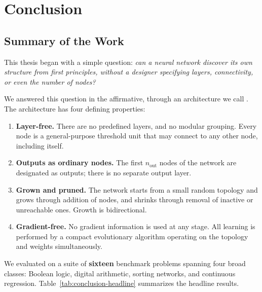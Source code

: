 
\chapter{Conclusion}
\label{ch:conclusion}

\section{Summary of the Work}

This thesis began with a simple question: \emph{can a neural network
discover its own structure from first principles, without a designer
specifying layers, connectivity, or even the number of nodes?}

We answered this question in the affirmative, through an architecture
we call \modnet{}. The architecture has four defining properties:

\begin{enumerate}
  \item \textbf{Layer-free.} There are no predefined layers, and no
    modular grouping. Every node is a general-purpose threshold unit
    that may connect to any other node, including itself.

  \item \textbf{Outputs as ordinary nodes.} The first $n_{\text{out}}$
    nodes of the network are designated as outputs; there is no separate
    output layer.

  \item \textbf{Grown and pruned.} The network starts from a small random
    topology and grows through addition of nodes, and shrinks through
    removal of inactive or unreachable ones. Growth is bidirectional.

  \item \textbf{Gradient-free.} No gradient information is used at any
    stage. All learning is performed by a compact evolutionary algorithm
    operating on the topology and weights simultaneously.
\end{enumerate}

We evaluated \modnet{} on a suite of \textbf{sixteen} benchmark problems
spanning four broad classes: Boolean logic, digital arithmetic, sorting
networks, and continuous regression. Table~\ref{tab:conclusion-headline}
summarizes the headline results.

